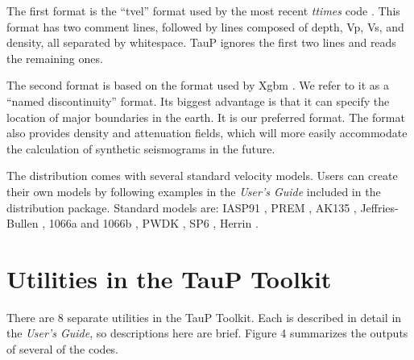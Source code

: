 The first format is the ``tvel'' format used by the most recent \textit{ttimes} code .
This format has two comment lines, followed by lines composed of depth, Vp, Vs, and
density, all separated by whitespace.
TauP ignores the first two lines and reads the remaining ones.

The second format is based on the format used by Xgbm \cite{xgbmmanual}.  
We refer to it as a ``named discontinuity'' format.
Its biggest advantage is that it can specify the location of major 
boundaries in the earth.
It is our preferred format.
The format also provides density and attenuation fields, which will more easily
accommodate the calculation of synthetic seismograms in the future.

The distribution comes with several standard velocity models.  
Users can create their own
models by following examples in the \textit{User's Guide} included in the 
distribution package.
Standard models are:
IASP91 \cite{iasp}, 
PREM \cite{prem},
AK135 ,
Jeffries-Bullen \cite{jb},
1066a and 1066b \cite{gilbert_dziewonski},
PWDK \cite{weber_davis},
SP6 \cite{morelli},
Herrin \cite{herrin}.

\section*{Utilities in the TauP Toolkit}

There are 8 separate utilities in the TauP Toolkit.  Each is described in detail in the
\textit{User's Guide}, so descriptions here are brief.  Figure 4 summarizes the outputs of
several of the codes.

